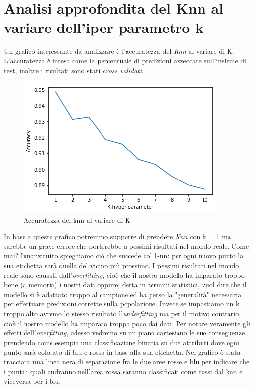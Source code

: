 \section{Analisi approfondita del Knn al variare dell'iper parametro k}
Un grafico interessante da analizzare \`e l'accuratezza del \textit{Knn} al variare di K. L'accuratezza \`e intesa come la percentuale di predizioni azzeccate sull'insieme di test, inoltre i risultati sono stati \textit{cross validati}.
\begin{figure}[H]
	\centering
	\includegraphics[width=0.7\linewidth]{img/accuracy_knn}
	\caption{Accuratezza del knn al variare di K}
	\label{fig:accuracyknn}
\end{figure}
In base a questo grafico potremmo supporre di prendere \textit{Knn} con k = 1 ma sarebbe un grave errore che porterebbe a pessimi risultati nel mondo reale. Come mai? Innanzitutto spieghiamo ci\`o che succede col 1-nn: per ogni nuovo punto la sua etichetta sar\`a quella del vicino pi\`u  prossimo. I pessimi risultati nel mondo reale sono causati dall'\textit{overfitting}, cio\`e che il nostro modello ha imparato troppo bene (a memoria) i nostri dati oppure, detta in termini statistici, vuol dire che il modello si \`e adattato troppo al campione ed ha perso la "generalit\`a" necessaria per effettuare predizioni corrette sulla popolazione. Invece se impostiamo un k troppo alto avremo lo stesso risultato l'\textit{underfitting} ma per il motivo contrario, cio\`e il nostro modello ha imparato troppo poco dai dati. Per notare veramente gli effetti dell'\textit{overfitting}, adesso vedremo su un piano cartesiano le sue conseguenze prendendo come esempio una classificazione binaria su due attributi dove ogni punto sar\`a colorato di blu e rosso in base alla sua etichetta. Nel grafico \`e stata tracciata una linea nera di separazione fra le due aree rosse e blu per indicare che i punti i quali andranno nell'area rossa saranno classificati come rossi dal knn e viceversa per i blu. 

